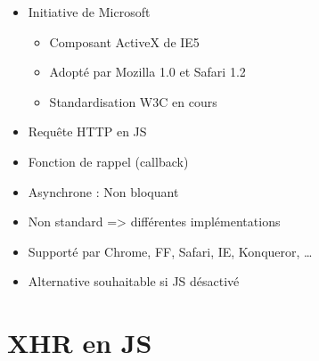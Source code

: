 \begin{itemize}
\tightlist
\item
  Initiative de Microsoft

  \begin{itemize}
  \tightlist
  \item
    Composant ActiveX de IE5
  \item
    Adopté par Mozilla 1.0 et Safari 1.2
  \item
    Standardisation W3C en cours
  \end{itemize}
\item
  Requête HTTP en JS
\item
  Fonction de rappel (callback)
\item
  Asynchrone : Non bloquant
\item
  Non standard =\textgreater{} différentes implémentations
\item
  Supporté par Chrome, FF, Safari, IE, Konqueror, \ldots{}
\item
  Alternative souhaitable si JS désactivé
\end{itemize}

\hypertarget{xhr-en-js}{%
\section{XHR en JS}\label{xhr-en-js}}

\begin{otherlanguage}{english}

\begin{Shaded}
\begin{Highlighting}[]
\OperatorTok{;}
 \NormalTok{() }
\OperatorTok{\{}
    \NormalTok{ (}\NormalTok{) }
    \OperatorTok{\{}
\OperatorTok{=}  \NormalTok{(}\NormalTok{)}\OperatorTok{;}
    \OperatorTok{\}}
     \NormalTok{ (}\NormalTok{) }
    \OperatorTok{\{}
\OperatorTok{=}  \NormalTok{()}\OperatorTok{;}
    \OperatorTok{\}}
\OperatorTok{\}}
\end{Highlighting}
\end{Shaded}

\end{otherlanguage}

